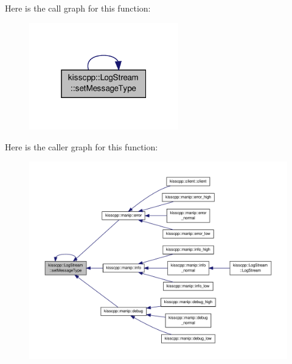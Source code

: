 Here is the call graph for this function\-:
\nopagebreak
\begin{figure}[H]
\begin{center}
\leavevmode
\includegraphics[width=184pt]{classkisscpp_1_1_log_stream_ad878a5863435605edaa35ee254f7702c_cgraph}
\end{center}
\end{figure}




Here is the caller graph for this function\-:
\nopagebreak
\begin{figure}[H]
\begin{center}
\leavevmode
\includegraphics[width=350pt]{classkisscpp_1_1_log_stream_ad878a5863435605edaa35ee254f7702c_icgraph}
\end{center}
\end{figure}


